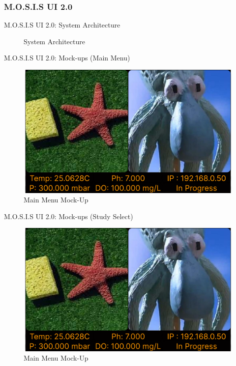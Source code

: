 \documentclass[17pt, aspectratio=169]{beamer}
\begin{document}
\subsubsection{M.O.S.I.S UI 2.0}
\begin{frame}{M.O.S.I.S UI 2.0: System Architecture}
	\begin{figure}
		\caption{System Architecture}
	\end{figure}
\end{frame}
\begin{frame}{M.O.S.I.S UI 2.0: Mock-ups (Main Menu)}
	\begin{figure}
		\includegraphics[page=1,height=0.65\textheight]{../../Progress_Report_Document/Appendix/Design_Documentation/User_Interface/Figures/M.O.S.I.S_UI_Design.pdf}
		\caption{Main Menu Mock-Up}
	\end{figure}
\end{frame}
\begin{frame}{M.O.S.I.S UI 2.0: Mock-ups (Study Select)}
	\begin{figure}
		\includegraphics[page=2,height=0.65\textheight]{../../Progress_Report_Document/Appendix/Design_Documentation/User_Interface/Figures/M.O.S.I.S_UI_Design.pdf}
		\caption{Main Menu Mock-Up}
	\end{figure}
\end{frame}
\end{document}
